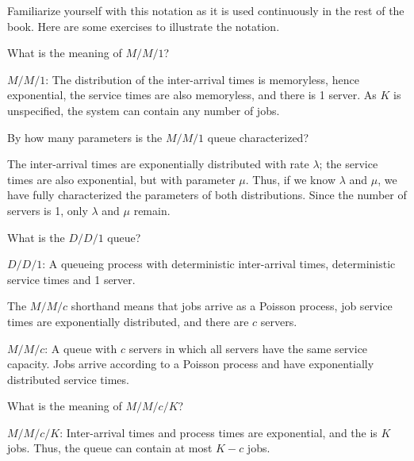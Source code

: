 Familiarize yourself with this notation as it is used continuously in the rest of the book. Here are some exercises to illustrate the notation.

\begin{extra}
 What is the meaning of $M/M/1$?
\begin{solution}
$M/M/1$: The distribution of the inter-arrival times is
 memoryless, hence exponential, the service times are also
 memoryless, and there is 1 server. As $K$ is unspecified, the system can contain any number of jobs.
\end{solution}
\end{extra}

\begin{extra}
 By how many parameters is the $M/M/1$ queue characterized?
\begin{solution}
 The inter-arrival times are exponentially distributed with rate $\lambda$; the service times are also exponential, but with parameter $\mu$. Thus, if we know $\lambda$ and $\mu$, we have fully characterized the parameters of both distributions. Since the number of servers is 1, only $\lambda$ and $\mu$ remain.
\end{solution}
\end{extra}

\begin{extra}
What is the $D/D/1$ queue? 
\begin{solution}
$D/D/1$: A queueing process with deterministic inter-arrival times, deterministic service times and 1 server.
\end{solution}
\end{extra}

\begin{extra}\mc
The $M/M/c$ shorthand means that jobs arrive as a Poisson process, job service times are exponentially distributed, and there are $c$ servers.
\begin{solution}
$M/M/c$: A  queue with $c$ servers in which
 all servers have the same service capacity. Jobs arrive according to a
 Poisson process and have exponentially distributed service times.
\end{solution}
\end{extra}

\begin{extra}
 What is the meaning of $M/M/c/K$?
\begin{solution}
$M/M/c/K$: Inter-arrival times and process times are exponential,
 and the  is $K$ jobs. Thus, the queue can
 contain at most $K-c$ jobs. 

\end{solution}
\end{extra}


